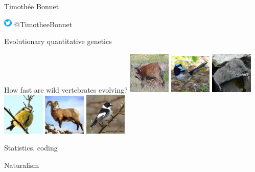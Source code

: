 \documentclass[10pt]{beamer}%
\title[]{}
\date{March 22, 2017}
\author[\footnotesize Timoth\'ee Bonnet ]{ }
\begin{document}
\begin{frame}{Timoth\'ee Bonnet}

\vfill
\includegraphics[width=0.03\textwidth]{Figures/tweeter.jpeg} @TimotheeBonnet
\end{frame}
\begin{frame}{Evolutionary quantitative genetics}
   
    \begin{alertblock}{How fast are wild vertebrates evolving?}
        \includegraphics[width=0.15\textwidth]{Figures/doe}
        \includegraphics[width=0.15\textwidth]{Figures/sfw}
        \includegraphics[width=0.15\textwidth]{Figures/vole}
        \includegraphics[width=0.15\textwidth]{Figures/bt}
        \includegraphics[width=0.15\textwidth]{Figures/bgs}
        \includegraphics[width=0.15\textwidth]{Figures/cfc}
    \end{alertblock}

\end{frame}
\begin{frame}{Statistics, coding}

\end{frame}
\begin{frame}{Naturalism}

\end{frame}
\end{document}
